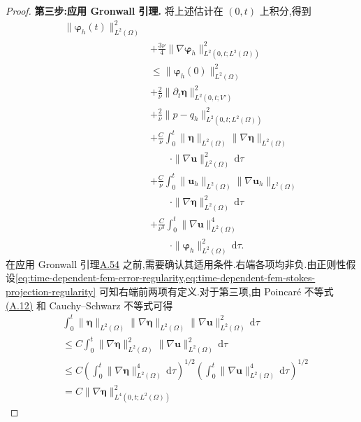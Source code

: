 \begin{theorem}
\begin{proof}
\textbf{第三步:应用 Gronwall 引理.}
将上述估计在 $(0,t)$ 上积分,得到
\begin{equation}\label{eq:time-dependent-fem-error-integrated}
\begin{aligned}
  \|\symbf{\varphi}_h(t)\|_{L^2(\Omega)}^2\\
  &+\frac{3\nu}{4}
      \|\nabla\symbf{\varphi}_h\|_{L^2(0,t;L^2(\Omega))}^2\\
  &\le\|\symbf{\varphi}_h(0)\|_{L^2(\Omega)}^2\\
    &+\frac{2}{\nu}
      \|\partial_t\symbf{\eta}\|_{L^2(0,t;V')}^2\\
   &+\frac{2}{\nu}
      \|p-q_h\|_{L^2(0,t;L^2(\Omega))}^2\\
    &+\frac{C}{\nu}\int_0^t
      \|\symbf{\eta}\|_{L^2(\Omega)}
      \|\nabla\symbf{\eta}\|_{L^2(\Omega)}\\
    &\qquad\cdot\|\nabla\bm{u}\|_{L^2(\Omega)}^2\,\mathrm{d}\tau\\
    &+\frac{C}{\nu}\int_0^t
      \|\bm{u}_h\|_{L^2(\Omega)}
      \|\nabla\bm{u}_h\|_{L^2(\Omega)}\\
    &\qquad\cdot\|\nabla\symbf{\eta}\|_{L^2(\Omega)}^2\,\mathrm{d}\tau\\
    &+\frac{C}{\nu^3}\int_0^t
      \|\nabla\bm{u}\|_{L^2(\Omega)}^4\\
    &\qquad\cdot\|\symbf{\varphi}_h\|_{L^2(\Omega)}^2\,\mathrm{d}\tau .
\end{aligned}
\end{equation}
在应用 Gronwall 引理\hyperref[lem:appendix-a-54]{A.54} 之前,需要确认其适用条件.右端各项均非负.由正则性假设\cref{eq:time-dependent-fem-error-regularity,eq:time-dependent-fem-stokes-projection-regularity} 可知右端前两项有定义.对于第三项,由 Poincaré 不等式\hyperref[eq:appendix-a-12]{(A.12)} 和 Cauchy--Schwarz 不等式可得
\begin{equation}\label{eq:time-dependent-fem-error-integrability-eta}
\begin{aligned}
  &\int_0^t
    \|\symbf{\eta}\|_{L^2(\Omega)}
    \|\nabla\symbf{\eta}\|_{L^2(\Omega)}
    \|\nabla\bm{u}\|_{L^2(\Omega)}^2\,\mathrm{d}\tau\\
  &\le C\int_0^t
    \|\nabla\symbf{\eta}\|_{L^2(\Omega)}^2
    \|\nabla\bm{u}\|_{L^2(\Omega)}^2\,\mathrm{d}\tau\\
  &\le C\left(\int_0^t
    \|\nabla\symbf{\eta}\|_{L^2(\Omega)}^4\,\mathrm{d}\tau\right)^{1/2}
    \left(\int_0^t
    \|\nabla\bm{u}\|_{L^2(\Omega)}^4\,\mathrm{d}\tau\right)^{1/2}\\
  &=C\|\nabla\symbf{\eta}\|_{L^4(0,t;L^2(\Omega))}^2

\end{aligned}
\end{equation}
\end{proof}
\end{theorem}
